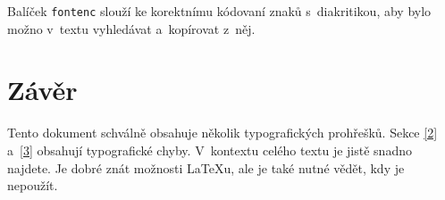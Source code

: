 \documentclass[twocolumn, a4paper]{article}
\begin{document}
Balíček \texttt{fontenc} slouží ke korektnímu kódovaní znaků s~diakritikou, aby bylo možno v~textu vyhledávat a~kopírovat z~něj.
\section{\textbf{Závěr}}
Tento dokument schválně obsahuje několik typografických prohřešků.
Sekce \ref{2} a~\ref{3} obsahují typografické chyby.
V~kontextu celého textu je jistě snadno najdete.
Je dobré znát možnosti \LaTeX u, ale je také nutné vědět, kdy je nepoužít.
\end{document}
